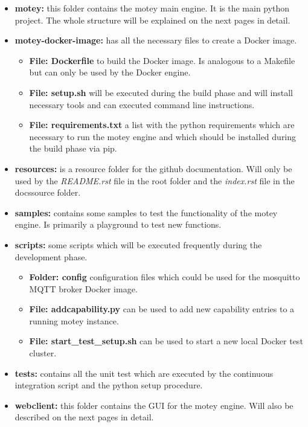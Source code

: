 \begin{itemize}
\begin{itemize}
  \end{itemize}
  \item{\textbf{motey:}} this folder contains the motey main engine. It is the main python project. The whole structure will be explained on the next pages in detail.
  \item{\textbf{motey-docker-image:}} has all the necessary files to create a Docker image.
  \begin{itemize}
    \item{\textbf{File: Dockerfile}} to build the Docker image. Is analogous to a Makefile but can only be used by the Docker engine.
    \item{\textbf{File: setup.sh}} will be executed during the build phase and will install necessary tools and can executed command line instructions.
    \item{\textbf{File: requirements.txt}} a list with the python requirements which are necessary to run the motey engine and which should be installed during the build phase via pip.
  \end{itemize}
  \item{\textbf{resources:}} is a resource folder for the github documentation. Will only be used by the \textit{README.rst} file in the root folder and the \textit{index.rst} file in the docs\/source folder.
  \item{\textbf{samples:}} contains some samples to test the functionality of the motey engine. Is primarily a playground to test new functions.
  \item{\textbf{scripts:}} some scripts which will be executed frequently during the development phase.
  \begin{itemize}
    \item{\textbf{Folder: config}} configuration files which could be used for the mosquitto \ac{MQTT} broker Docker image.
    \item{\textbf{File: addcapability.py}} can be used to add new capability entries to a running motey instance.
    \item{\textbf{File: start\_test\_setup.sh}} can be used to start a new local Docker test cluster.
  \end{itemize}
  \item{\textbf{tests:}} contains all the unit test which are executed by the continuous integration script and the python setup procedure.
  \item{\textbf{webclient:}} this folder contains the \ac{GUI} for the motey engine. Will also be described on the next pages in detail.
\end{itemize}

